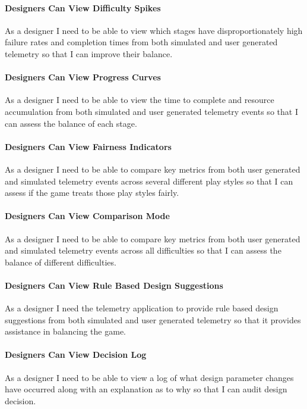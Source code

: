 \paragraph{Designers Can View Difficulty Spikes}
As a designer I need to be able to view which stages have disproportionately high failure rates and completion times from both simulated and user generated telemetry so that I can improve their balance.

\paragraph{Designers Can View Progress Curves}
As a designer I need to be able to view the time to complete and resource accumulation from both simulated and user generated telemetry events so that I can assess the balance of each stage.

\paragraph{Designers Can View Fairness Indicators}
As a designer I need to be able to compare key metrics from both user generated and simulated telemetry events across several different play styles so that I can assess if the game treats those play styles fairly.

\paragraph{Designers Can View Comparison Mode}
As a designer I need to be able to compare key metrics from both user generated and simulated telemetry events across all difficulties so that I can assess the balance of different difficulties.

\paragraph{Designers Can View Rule Based Design Suggestions}
As a designer I need the telemetry application to provide rule based design suggestions from both simulated and user generated telemetry so that it provides assistance in balancing the game.

\paragraph{Designers Can View Decision Log}
As a designer I need to be able to view a log of what design parameter changes have occurred along with an explanation as to why so that I can audit design decision.

